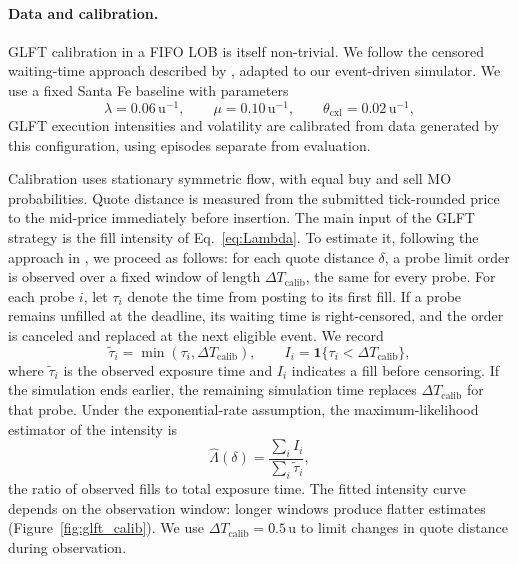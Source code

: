 \documentclass[11pt,a4paper]{article}
\begin{document}
\paragraph{Data and calibration.}
GLFT calibration in a FIFO LOB is itself non-trivial.  We follow the
censored waiting-time approach described by
\citet{fernandeztapia2015modeling}, adapted to our
event-driven simulator.  We use a fixed Santa Fe baseline with parameters
\begin{equation}
  \lambda = 0.06\,\mathrm{u}^{-1}, \qquad
  \mu = 0.10\,\mathrm{u}^{-1}, \qquad
  \theta_{\mathrm{cxl}} = 0.02\,\mathrm{u}^{-1},
\end{equation}
GLFT execution intensities
and volatility are calibrated from data generated by this
configuration, using episodes separate from evaluation.

Calibration uses stationary symmetric flow, with equal buy and sell MO
probabilities. Quote distance is measured from the submitted tick-rounded
price to the mid-price immediately before insertion.
The main input of the GLFT strategy is the fill intensity of
Eq.~\ref{eq:Lambda}. To estimate it, following the approach in
\citet{fernandeztapia2015modeling}, we proceed as follows: for each
quote distance $\delta$, a probe limit order is observed over a fixed
window of length $\Delta T_{\mathrm{calib}}$, the same for every probe.
For each probe $i$, let $\tau_i$ denote the time from posting to its
first fill. If a probe remains unfilled at the deadline, its waiting
time is right-censored, and the order is canceled and replaced at the
next eligible event. We record
\begin{equation}
    \widetilde{\tau}_i = \min(\tau_i,\Delta T_{\mathrm{calib}}),
    \qquad
    I_i = \mathbf{1}\{\tau_i < \Delta T_{\mathrm{calib}}\},
\end{equation}
where $\widetilde{\tau}_i$ is the observed exposure time and $I_i$
indicates a fill before censoring. If the simulation ends earlier,
the remaining simulation time replaces $\Delta T_{\mathrm{calib}}$
for that probe. Under the exponential-rate assumption, the
maximum-likelihood estimator of the intensity is
\begin{equation}
    \hat{\Lambda}(\delta)
    = \frac{\sum_i I_i}{\sum_i \widetilde{\tau}_i},
\end{equation}
the ratio of observed fills to total exposure time. The fitted
intensity curve depends on the observation window: longer windows
produce flatter estimates (Figure~\ref{fig:glft_calib}). We use
$\Delta T_{\mathrm{calib}}=0.5\,\mathrm{u}$ to limit changes in quote
distance during observation.
\end{document}
